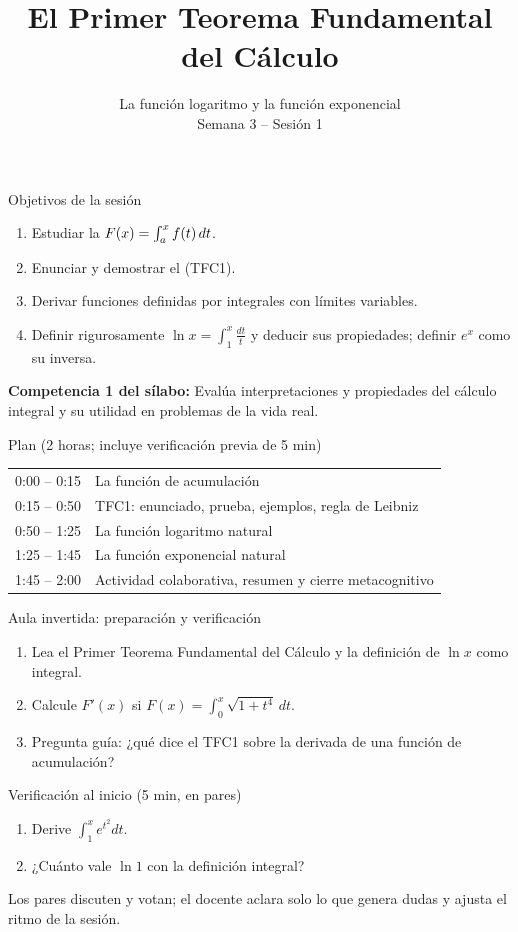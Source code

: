 \documentclass[10pt,aspectratio=169]{beamer}
\title[Primer TFC. Logaritmo y exponencial]{El Primer Teorema Fundamental del Cálculo}
\subtitle{La función logaritmo y la función exponencial\\[2pt]\small Semana 3 -- Sesión 1}
\begin{document}
\begin{frame}
  \titlepage
\end{frame}

\begin{frame}{Objetivos de la sesión}
  \begin{enumerate}
    \item Estudiar la  $F(x)=\int_a^xf(t)\,dt$.
    \item Enunciar y demostrar el  (TFC1).
    \item Derivar funciones definidas por integrales con límites variables.
    \item Definir rigurosamente $\ln x=\int_1^x\frac{dt}{t}$ y deducir sus propiedades; definir $e^x$ como su inversa.
  \end{enumerate}
  \vspace{1mm}
  {\small\textbf{Competencia 1 del sílabo:} Evalúa interpretaciones y propiedades del cálculo integral y su utilidad en problemas de la vida real.}
  \begin{block}{Plan (2 horas; incluye verificación previa de 5 min)}
    \begin{tabular}{ll}
      0:00 -- 0:15 & La función de acumulación\\
      0:15 -- 0:50 & TFC1: enunciado, prueba, ejemplos, regla de Leibniz\\
      0:50 -- 1:25 & La función logaritmo natural\\
      1:25 -- 1:45 & La función exponencial natural\\
      1:45 -- 2:00 & Actividad colaborativa, resumen y cierre metacognitivo
    \end{tabular}
  \end{block}
\end{frame}

\begin{frame}{Aula invertida: preparación y verificación}
  \small
  \begin{previa}
    \begin{enumerate}
      \item Lea el Primer Teorema Fundamental del Cálculo y la definición de $\ln x$ como integral.
      \item Calcule $F'(x)$ si $F(x)=\int_0^x\sqrt{1+t^4}\,dt$.
      \item Pregunta guía: ¿qué dice el TFC1 sobre la derivada de una función de acumulación?
    \end{enumerate}
  \end{previa}
  \begin{block}{Verificación al inicio (5 min, en pares)}
    \begin{enumerate}
      \item Derive $\int_1^xe^{t^2}dt$.
      \item ¿Cuánto vale $\ln1$ con la definición integral?
    \end{enumerate}
    Los pares discuten y votan; el docente aclara solo lo que genera dudas y ajusta el ritmo de la sesión.
  \end{block}
\end{frame}
\end{document}
